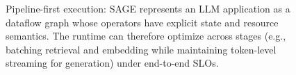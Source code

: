 \begin{figure}[t]
      \centering
      \caption{Pipeline-first execution: SAGE represents an LLM application as a dataflow graph whose operators
      have explicit state and resource semantics. The runtime can therefore optimize across stages (e.g., batching
      retrieval and embedding while maintaining token-level streaming for generation) under end-to-end SLOs.}
      \label{fig:sage_pipeline}
\end{figure}
